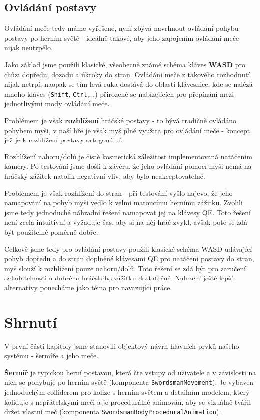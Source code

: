 \pagebreak

\subsection{Ovládání postavy}

Ovládání meče tedy máme vyřešené, nyní zbývá navrhnout ovládání pohybu postavy po herním světě - ideálně takové, aby jeho zapojením ovládání meče nijak neutrpělo. 

Jako základ jsme použili klasické, všeobecně známé schéma kláves \textbf{WASD} pro chůzi dopředu, dozadu a úkroky do stran. Ovládání meče z takového rozhodnutí nijak netrpí, naopak se tím levá ruka dostává do oblasti klávesnice, kde se nalézá mnoho kláves (\texttt{Shift}, \texttt{Ctrl},...) přirozeně se nabízejících pro přepínání mezi jednotlivými mody ovládání meče.

Problémem je však \textbf{rozhlížení} hráčské postavy - to bývá tradičně ovládáno pohybem myši, v naší hře je však myš plně využita pro ovládání meče - koncept, jež je k rozhlížení postavy ortogonální. 

Rozhlížení nahoru/dolů je čistě kosmetická záležitost implementovaná natáčením kamery. Po testování jsme došli k závěru, že jeho ovládání pomocí myši nemá na hráčský zážitek natolik negativní vliv, aby bylo neakceptovatelné. 

Problémem je však rozhlížení do stran - při testování vyšlo najevo, že jeho namapování na pohyb myši vedlo k velmi matoucímu hernímu zážitku. Zvolili jsme tedy jednoduché náhradní řešení namapovat jej na klávesy QE. Toto řešení není zcela intuitivní a vyžaduje čas, aby si na něj hráč zvykl, avšak poté se zdá být použitelné poměrně dobře.

\bigbreak
Celkově jsme tedy pro ovládání postavy použili klasické schéma WASD udávající pohyb dopředu a do stran doplněné klávesami QE pro natáčení postavy do stran, myš slouží k rozhlížení pouze nahoru/dolů. Toto řešení se zdá být pro zaručení ovladatelnosti a dobrého hráčského zážitku dostatečné. Nalezení ještě lepší alternativy ponecháme jako téma pro navazující práce.

\section{Shrnutí}

V první části kapitoly jsme stanovili objektový návrh hlavních prvků našeho systému - šermíře a jeho meče. 

\textbf{Šermíř} je typickou herní postavou, která čte vstupy od uživatele a v závislosti na nich se pohybuje po herním světě (komponenta \texttt{SwordsmanMovement}). Je vybaven jednoduchým colliderem pro kolize s herním světem a detailním modelem, který koliduje s nepřátelskými meči a je procedurálně animován, aby se vizuálně tvářil držet vlastní meč (komponenta \texttt{SwordsmanBodyProceduralAnimation}). 

